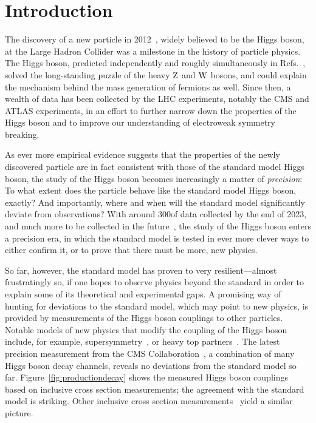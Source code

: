 \section{Introduction}
\label{sec:introduction}


The discovery of a new particle in 2012~\cite{Aad:2012tfa,Chatrchyan:2012xdj,Chatrchyan:2013lba}, widely believed to be the Higgs boson, at the Large Hadron Collider was a milestone in the history of particle physics.
% 
The Higgs boson, predicted independently and roughly simultaneously in Refs.~\cite{Higgs:1964pj,Englert:1964et,Guralnik:1964eu}, solved the long-standing puzzle of the heavy $\mathrm{Z}$ and $\mathrm{W}$ bosons, and could explain the mechanism behind the mass generation of fermions as well.
% 
Since then, a wealth of data has been collected by the LHC experiments, notably the CMS and ATLAS experiments, in an effort to further narrow down the properties of the Higgs boson and to improve our understanding of electroweak symmetry breaking.


As ever more empirical evidence suggests that the properties of the newly discovered particle are in fact consistent with those of the standard model Higgs boson,
% 
% 
the study of the Higgs boson becomes increasingly a matter of \textit{precision}: To what extent does the particle behave like the standard model Higgs boson, exactly?
% 
And importantly, where and when will the standard model significantly deviate from observations?
% 
With around 300\fbinv of data collected by the end of 2023, and much more to be collected in the future~\cite{hllhc}, the study of the Higgs boson enters a precision era, in which the standard model is tested in ever more clever ways to either confirm it, or to prove that there must be more, new physics.


So far, however, the standard model has proven to very resilient---almost frustratingly so, if one hopes to observe physics beyond the standard in order to explain some of its theoretical and experimental gaps.
% 
A promising way of hunting for deviations to the standard model, which may point to new physics, is provided by measurements of the Higgs boson couplings to other particles.
% 
Notable models of new physics that modify the coupling of the Higgs boson include, for example, supersymmetry~\cite{Dimopoulos:1981zb,Witten:1981nf}, or heavy top partners~\cite{ArkaniHamed:2002qy,Banfi:2013yoa}.
% 
The latest precision measurement from the CMS Collaboration~\cite{Sirunyan:2018koj}, a combination of many Higgs boson decay channels, reveals no deviations from the standard model so far.
% 
Figure~\ref{fig:productiondecay} shows the measured Higgs boson couplings based on inclusive cross section measurements; the agreement with the standard model is striking.
% 
Other inclusive cross section measurements~\cite{Khachatryan:2016vau,Aad:2015zhl} yield a similar picture.



